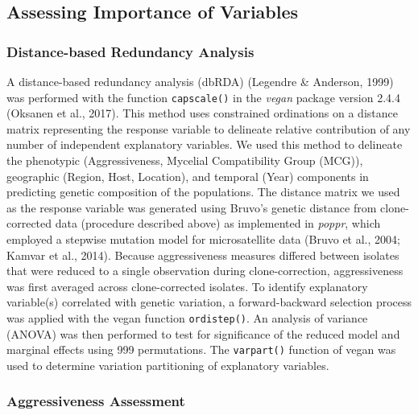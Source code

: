 \documentclass[fleqn,10pt,lineno]{wlpeerj} %
\theoremstyle{definition}
\theoremstyle{definition}
\theoremstyle{definition}
\theoremstyle{remark}
\begin{document}
\subsection*{Assessing Importance of
Variables}\label{assessing-importance-of-variables}

\subsubsection*{Distance-based Redundancy
Analysis}\label{distance-based-redundancy-analysis}

A distance-based redundancy analysis (dbRDA) (Legendre \& Anderson,
1999) was performed with the function \texttt{capscale()} in the
\emph{vegan} package version 2.4.4 (Oksanen et al., 2017). This method
uses constrained ordinations on a distance matrix representing the
response variable to delineate relative contribution of any number of
independent explanatory variables. We used this method to delineate the
phenotypic (Aggressiveness, Mycelial Compatibility Group (MCG)),
geographic (Region, Host, Location), and temporal (Year) components in
predicting genetic composition of the populations. The distance matrix
we used as the response variable was generated using Bruvo's genetic
distance from clone-corrected data (procedure described above) as
implemented in \emph{poppr}, which employed a stepwise mutation model
for microsatellite data (Bruvo et al., 2004; Kamvar et al., 2014).
Because aggressiveness measures differed between isolates that were
reduced to a single observation during clone-correction, aggressiveness
was first averaged across clone-corrected isolates. To identify
explanatory variable(s) correlated with genetic variation, a
forward-backward selection process was applied with the vegan function
\texttt{ordistep()}. An analysis of variance (ANOVA) was then performed
to test for significance of the reduced model and marginal effects using
999 permutations. The \texttt{varpart()} function of vegan was used to
determine variation partitioning of explanatory variables.

\subsubsection*{Aggressiveness
Assessment}\label{aggressiveness-assessment}
\end{document}

